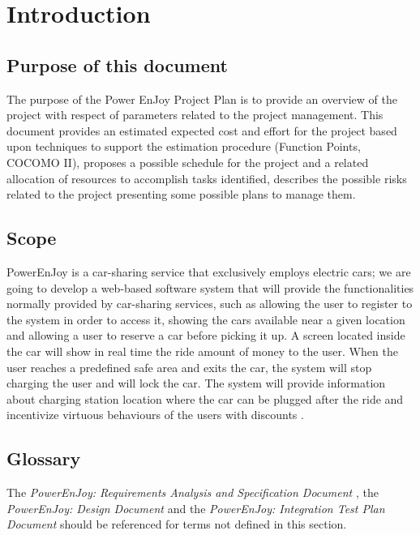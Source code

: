 \section{Introduction}

\subsection{Purpose of this document}
The purpose of the Power EnJoy Project Plan is to provide an overview of the project with respect of parameters related to the project management. This document provides an estimated expected cost and effort for the project based upon techniques to support the estimation
procedure (Function Points, COCOMO II), proposes a possible schedule for the project and a related allocation of resources to accomplish tasks identified, describes the possible risks related to the project presenting some possible plans to manage them.


\subsection{Scope}
PowerEnJoy is a car-sharing service that exclusively employs electric cars; we are going to develop a web-based software system that will provide the functionalities normally provided by car-sharing services, such as allowing the user to register to the system in order to access it, showing the cars available near a given location and allowing a user to reserve a car before picking it up.
A screen located inside the car will show in real time the ride amount of money to the user. When the user reaches a predefined safe area and exits the car, the system will stop charging the user and will lock the car. The system will provide information about charging station location where the car can be plugged after the ride and incentivize virtuous behaviours of the users with discounts \cite{RASD}.

\subsection{Glossary}
The \emph{PowerEnJoy: Requirements Analysis and Specification Document} \cite{RASD}, the \emph{PowerEnJoy: Design Document} \cite{DD} and the \emph{PowerEnJoy: Integration Test Plan Document} \cite{ITPD} should be referenced for terms not defined in this section.

